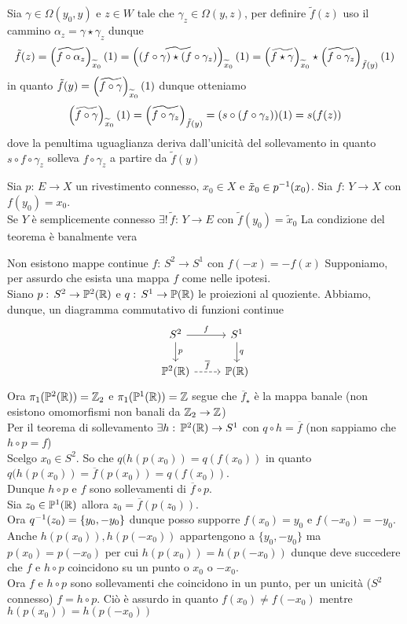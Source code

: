 \begin{thm}
Sia $\gamma\in \Omega(y_0, y)$ e $z\in W$ tale che $\gamma_z \in \Omega(y,z)$, per definire $\tilde{f}(z)$ uso il cammino $\alpha_z= \gamma \star \gamma_z$ dunque
$$ \tilde{f}(z)= \left(\widetilde{f \circ \alpha_z}\right)_{\widetilde{x}_{0}} (1) = \left(\widetilde{(f\circ \gamma) \star (f\circ \gamma_z)}\right)_{\widetilde{x}_{0}} (1) = \left(\widetilde{f\star \gamma}\right)_{\widetilde{x}_{0}} \star \left(\widetilde{f\circ \gamma_z}\right)_{\tilde{f}(y)}(1)$$
in quanto $\tilde{f}(y)= \left(\widetilde{f\circ \gamma}\right)_{\widetilde{x}_{0}} (1) $ dunque otteniamo 
$$\left(\widetilde{f\circ \gamma}\right)_{\widetilde{x}_{0}} (1) =  \left( \widetilde{f \circ \gamma_z}\right)_{\tilde{f}(y)} = (s \circ(f\circ \gamma_z))(1)=s(f(z))$$
dove la penultima uguaglianza deriva dall'unicit\`a del sollevamento in quanto $s\circ f \circ \gamma_z$ solleva $f\circ \gamma_z$ a partire da $\tilde{f}(y)$
\endproof
\end{thm}
\begin{cor} Sia $p:\, E \to X$ un rivestimento connesso, $x_0\in X$ e $\tilde{x}_0\in p^{-1} (x_0)$.
Sia $f:\, Y \to X$ con $f(y_0)=x_0$.\\
Se $Y$ \`e semplicemente connesso $\exists ! \, \tilde{f}:\, Y \to E $ con $\tilde{f}(y_0)=\tilde{x}_0$
\proof La condizione del teorema \`e banalmente vera
\end{cor}
\begin{thm} Non esistono mappe continue  $f:\, S^2 \to S^1 $ con $f(-x)=-f(x)$
\proof Supponiamo, per assurdo che esista una mappa $f$ come nelle ipotesi.\\
Siano $p:\, S^2 \to \mathbb{P}^2(\mathbb{R})$ e $q:\, S^1 \to \mathbb{P}(\mathbb{R})$ le proiezioni al quoziente. Abbiamo, dunque, un diagramma commutativo di funzioni continue
$$\begin{tikzcd}
S^2 \arrow[r,"f"] \arrow[d,"p"] & S^1 \arrow[d,"q"] \\
\mathbb{P}^2(\R) \arrow[dashed]{r}{\overline{f}} &\mathbb{P}(\R)
\end{tikzcd}$$
Ora $\pi_1(\mathbb{P}^2 (\mathbb{R})) =\mathbb{Z}_2$ e $\pi_1(\mathbb{P}^1 (\mathbb{R}) )=\mathbb{Z}$ segue che $\overline{f}_\star$ \`e la mappa banale (non esistono omomorfismi non banali da $\mathbb{Z}_2 \to \mathbb{Z}$)\\
Per il teorema di sollevamento $\exists h:\, \mathbb{P}^2 (\mathbb{R}) \to S^1 $ con $q \circ h = \overline{f}$ (non sappiamo che $h\circ p = f$)\\
Scelgo $x_0\in S^2$. So che $ q(h(p(x_0))=q(f(x_0))$ in quanto $q(h(p(x_0))=\overline{f}(p(x_0))= q(f(x_0))$.\\
Dunque $h\circ p $ e $f$ sono sollevamenti di $\overline{f}\circ p$.\\
Sia $z_0 \in \mathbb{P}^1 (\mathbb{R}) $ allora $z_0 =\overline{f}(p(z_0))$.\\
Ora $q^{-1} (z_0)=\{ y_0, -y_0\}$ dunque posso supporre $f(x_0)=y_0$ e $f(-x_0)=-y_0$.\\
Anche $h(p(x_0)), h(p(-x_0))$ appartengono a $\{ y_0, -y_0\}$ ma $p(x_0)=p(-x_0)$ per cui $h(p(x_0))=h(p(-x_0))$ dunque deve succedere che $f$ e $h\circ p $ coincidono su un punto o $x_0$ o $-x_0$.\\
Ora $f$  e $h \circ p $ sono sollevamenti che coincidono in un punto, per un unicit\`a ($S^2$ connesso) $f=h \circ p $. Ci\`o \`e assurdo in quanto $f(x_0)\neq f(-x_0)$ mentre $h(p(x_0))=h(p(-x_0))$
\endproof
\end{thm}
